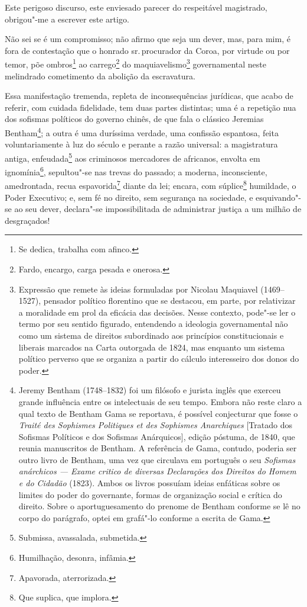Este perigoso discurso, este enviesado parecer do respeitável
magistrado, obrigou"-me a escrever este artigo.

\asterisc

Não sei se é um compromisso; não afirmo que seja um dever, mas, para
mim, é fora de contestação que o honrado sr.\,procurador da Coroa, por
virtude ou por temor, põe ombros\footnote{Se dedica, trabalha com
  afinco.} ao carrego\footnote{Fardo, encargo, carga pesada e onerosa.}
do maquiavelismo\footnote{Expressão que remete às ideias formuladas
  por Nicolau Maquiavel (1469--1527), pensador político florentino que se
  destacou, em parte, por relativizar a moralidade em prol da
  eficácia das decisões. Nesse contexto, pode"-se ler o termo por seu
  sentido figurado, entendendo a ideologia governamental não como um
  sistema de direitos subordinado aos princípios constitucionais e
  liberais marcados na Carta outorgada de 1824, mas enquanto um sistema
  político perverso que se organiza a partir do cálculo interesseiro dos
  donos do poder.} governamental neste melindrado cometimento da
abolição da escravatura.

Essa manifestação tremenda, repleta de inconsequências jurídicas, que
acabo de referir, com cuidada fidelidade, tem duas partes distintas; uma
é a repetição nua dos sofismas políticos do governo chinês, de que fala
o clássico Jeremias Bentham\footnote{Jeremy Bentham (1748--1832) foi um
  filósofo e jurista inglês que exerceu grande influência entre os
  intelectuais de seu tempo. Embora não reste claro a
  qual texto de Bentham Gama se reportava, é possível conjecturar que
  fosse o \emph{Traité des Sophismes Politiques et des Sophismes
  Anarchiques} {[}Tratado dos Sofismas Políticos e dos Sofismas
  Anárquicos{]}, edição póstuma, de 1840, que reunia manuscritos de
  Bentham. A referência de Gama, contudo, poderia ser outro livro de
  Bentham, uma vez que circulava em português o seu \emph{Sofismas
  anárchicos --- Exame critico de diversas Declarações dos Direitos do
  Homem e do Cidadão} (1823). Ambos os livros possuíam ideias enfáticas
  sobre os limites do poder do governante, formas de organização social
  e crítica do direito. Sobre o aportuguesamento do prenome de Bentham
  conforme se lê no corpo do parágrafo, optei em grafá"-lo conforme a
  escrita de Gama.}; a outra é uma duríssima verdade, uma confissão
espantosa, feita voluntariamente à luz do século e perante a razão
universal: a magistratura antiga, enfeudada\footnote{Submissa,
  avassalada, submetida.} aos criminosos mercadores de africanos,
envolta em ignomínia\footnote{Humilhação, desonra, infâmia.},
sepultou"-se nas trevas do passado; a moderna, inconsciente, amedrontada,
recua espavorida\footnote{Apavorada, aterrorizada.} diante da lei;
encara, com súplice\footnote{Que suplica, que implora.} humildade, o
Poder Executivo; e, sem fé no direito, sem segurança na sociedade, e
esquivando"-se ao seu dever, declara"-se impossibilitada de administrar
justiça a um milhão de desgraçados!

